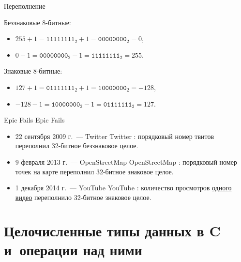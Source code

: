\documentclass{beamer}
\newcommand{\eng}[1]{%
  \ifxetex%
    {\textenglish{#1}}%
  \else%
    {\foreignlanguage{english}{#1}}%
  \fi%
}
\newcommand{\pcnum}[1]{\ensuremath{\mathtt{#1}}}
\newcommand{\bin}[1]{\pcnum{#1}_2}
\begin{document}
\begin{frame}{Переполнение}

  Беззнаковые 8-битные:
  \begin{itemize}
    \item $255 + 1 = \bin{1111 1111} + 1 = \bin{0000 0000} = 0$,
    \item $0 - 1 = \bin{0000 0000} - 1 = \bin{1111 1111} = 255$.
  \end{itemize}

  Знаковые 8-битные:
  \begin{itemize}
    \item $127 + 1 = \bin{0111 1111} + 1 = \bin{1000 0000} = -128$,
    \item $-128 - 1 = \bin{1000 0000} - 1 = \bin{0111 1111} = 127$.
  \end{itemize}

\end{frame}

\begin{frame}{\eng{Epic Fails}}

  \begin{itemize}
    \item 22 сентября 2009 г.~--- \eng{Twitter}: порядковый номер твитов
      переполнил 32-битное беззнаковое целое.

    \item 9 февраля 2013 г.~--- \eng{OpenStreetMap}: порядковый номер точек на
      карте переполнил 32-битное знаковое целое.

    \item 1 декабря 2014 г.~--- \eng{YouTube}: количество просмотров
      \href{https://www.youtube.com/watch?v=9bZkp7q19f0}{одного видео}
      переполнило 32-битное знаковое целое.
  \end{itemize}


\end{frame}

\section{Целочисленные типы данных в C и~операции над ними}
\end{document}
